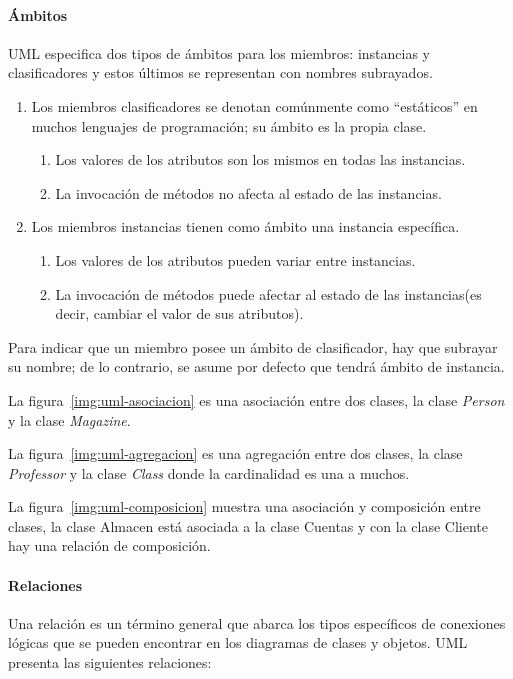 \paragraph*{Ámbitos}

UML especifica dos tipos de ámbitos para los miembros: instancias y clasificadores y estos últimos se representan con nombres subrayados.

\begin{enumerate}
    \item Los miembros clasificadores se denotan comúnmente como “estáticos” en muchos lenguajes de programación; su ámbito es la propia clase.
    \begin{enumerate}
        \item Los valores de los atributos son los mismos en todas las instancias.
        \item La invocación de métodos no afecta al estado de las instancias.
    \end{enumerate}
    \item Los miembros instancias tienen como ámbito una instancia específica.
\begin{enumerate}
    \item Los valores de los atributos pueden variar entre instancias.
    \item La invocación de métodos puede afectar al estado de las instancias(es decir, cambiar el valor de sus atributos).
\end{enumerate}
\end{enumerate}
Para indicar que un miembro posee un ámbito de clasificador, hay que subrayar su nombre; de lo contrario, se asume por defecto que tendrá ámbito de instancia.



La figura~\ref{img:uml-asociacion} es una asociación entre dos clases, la clase \textit{Person} y la clase \textit{Magazine}.

La figura~\ref{img:uml-agregacion} es una agregación entre dos clases, la clase \textit{Professor} y la clase \textit{Class} donde la cardinalidad es una a muchos.

La figura~\ref{img:uml-composicion} muestra una  asociación y composición entre clases, la clase Almacen está asociada a la clase Cuentas y con la clase Cliente hay una relación de composición.


\paragraph*{Relaciones}
Una relación es un término general que abarca los tipos específicos de conexiones lógicas que se pueden encontrar en los diagramas de clases y objetos. UML presenta las siguientes relaciones:

